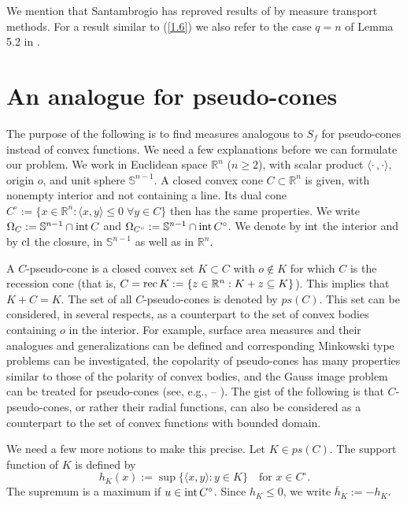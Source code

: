 \documentclass[12pt]{article}
\newcommand{\0}{\mbox{\boldmath$o$}}
\newcommand{\Sn}{{\mathbb S}^{n-1}}
\newcommand{\R}{{\mathbb R}}
\begin{document}
We mention that Santambrogio \cite{San16} has reproved results of \cite{CK15} by measure transport methods. For a result similar to (\ref{1.6}) we also refer to the case $q=n$ of Lemma 5.2 in \cite{HLXZ16}. 





\section{An analogue for pseudo-cones}\label{sec2}

The purpose of the following is to find measures analogous to $S_f$ for pseudo-cones instead of convex functions. We need a few explanations before we can formulate our problem. We work in Euclidean space $\R^n$ ($n\ge 2$), with scalar product $\langle\cdot\,,\cdot\rangle$, origin $o$, and unit sphere $\Sn$. A  closed convex cone $C\subset\R^n$ is given, with nonempty interior and not containing a line. Its dual cone $C^\circ:= \{x\in\R^n: \langle x,y\rangle\le 0\;\forall y\in C\}$ then has the same properties. We write $\Omega_C:= \Sn\cap{\rm int}\,C$ and $\Omega_{C^\circ}:= \Sn\cap {\rm int}\, C^\circ$. We denote by ${\rm int}$ the interior and by  ${\rm cl}$ the closure, in $\Sn$ as well as in $\R^n$.

A $C$-pseudo-cone is a closed convex set $K\subset C$ with $o\notin K$ for which $C$ is the recession cone (that is, $C={\rm rec}\,K:=\{z\in \R^n: K+z \subseteq K\}$). This implies that $K+C= K$. The set of all $C$-pseudo-cones is denoted by $ps(C)$. This set can be considered, in several respects, as a counterpart to the set of convex bodies containing $o$ in the interior. For example, surface area measures and their analogues and generalizations can be defined and corresponding Minkowski type problems can be investigated, the copolarity of pseudo-cones has many properties similar to those of the polarity of convex bodies, and the Gauss image problem can be treated for pseudo-cones (see, e.g., \cite{Sch18} -- \cite{Sch25d}). The gist of the following is that $C$-pseudo-cones, or rather their radial functions, can also be considered as a counterpart to the set of convex functions with bounded domain.

We need a few more notions to make this precise. Let $K\in ps(C)$. The support function of $K$ is defined by
$$ h_K(x):= \sup\{\langle x,y\rangle: y\in K\}\quad\mbox{for }x\in C^\circ.$$
The supremum is a maximum if $u\in {\rm int}\,C^\circ$. Since $h_K\le 0$, we write $\overline h_K:=-h_K$. 
\end{document}
